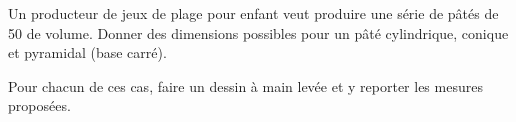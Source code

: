 
\begin{exercice}\label{exo2smath-0185}

    Un producteur de jeux de plage pour enfant veut produire une série de pâtés de \unit{50}{\centi\liter} de volume. Donner des dimensions possibles pour un pâté cylindrique, conique et pyramidal (base carré).

    Pour chacun de ces cas, faire un dessin à main levée et y reporter les mesures proposées.

\end{exercice}
